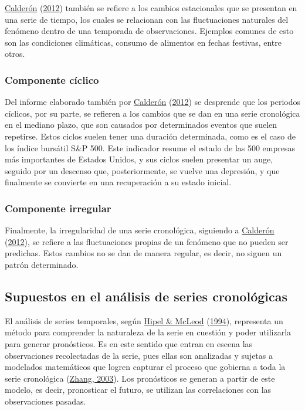 \documentclass[
]{article}
\begin{document}
\protect\hyperlink{ref-calderon2012estadistica}{Calderón}
(\protect\hyperlink{ref-calderon2012estadistica}{2012}) también se
refiere a los cambios estacionales que se presentan en una serie de
tiempo, los cuales se relacionan con las fluctuaciones naturales del
fenómeno dentro de una temporada de observaciones. Ejemplos comunes de
esto son las condiciones climáticas, consumo de alimentos en fechas
festivas, entre otros.

\subsubsection{Componente cíclico}

Del informe elaborado también por
\protect\hyperlink{ref-calderon2012estadistica}{Calderón}
(\protect\hyperlink{ref-calderon2012estadistica}{2012}) se desprende que
los periodos cíclicos, por su parte, se refieren a los cambios que se
dan en una serie cronológica en el mediano plazo, que son causados por
determinados eventos que suelen repetirse. Estos ciclos suelen tener una
duración determinada, como es el caso de los índice bursátil S\&P 500.
Este indicador resume el estado de las 500 empresas más importantes de
Estados Unidos, y sus ciclos suelen presentar un auge, seguido por un
descenso que, posteriormente, se vuelve una depresión, y que finalmente
se convierte en una recuperación a su estado inicial.

\subsubsection{Componente irregular}

Finalmente, la irregularidad de una serie cronológica, siguiendo a
\protect\hyperlink{ref-calderon2012estadistica}{Calderón}
(\protect\hyperlink{ref-calderon2012estadistica}{2012}), se refiere a
las fluctuaciones propias de un fenómeno que no pueden ser predichas.
Estos cambios no se dan de manera regular, es decir, no siguen un patrón
determinado.

\subsection{Supuestos en el análisis de series cronológicas}

El análisis de series temporales, según
\protect\hyperlink{ref-Hipel}{Hipel \& McLeod}
(\protect\hyperlink{ref-Hipel}{1994}), representa un método para
comprender la naturaleza de la serie en cuestión y poder utilizarla para
generar pronósticos. Es en este sentido que entran en escena las
observaciones recolectadas de la serie, pues ellas son analizadas y
sujetas a modelados matemáticos que logren capturar el proceso que
gobierna a toda la serie cronológica
(\protect\hyperlink{ref-Zhang}{Zhang, 2003}). Los pronósticos se generan
a partir de este modelo, es decir, pronosticar el futuro, se utilizan
las correlaciones con las observaciones pasadas.
\end{document}
